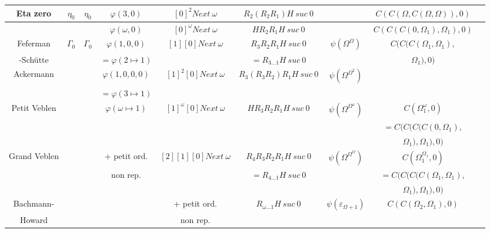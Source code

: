 \documentclass[12pt]{beamer}
\begin{document}
\begin{frame}
\begin{changemargin}{-0.9cm}{0cm}
\begin{tabular}{|c|c|c|c|c|c|c|c|c|}
Eta zero	& \(\eta_0\)		& \(\eta_0\)			& \(\varphi(3,0)\)		& \([0]^2 Next\ \omega\) 	& \(R_2 (R_2 R_1) H\ suc\ 0\)&					& \(C(C(\Omega,C(\Omega,\Omega)),0)\) \\ \hline
		&			&			& \(\varphi(\omega,0)\)		& \([0]^\omega Next\ \omega\) & \(H R_2 R_1 H\ suc\ 0\)&					& \(C(C(C(0,\Omega_1),\Omega_1),0)\) \\ \hline
Feferman	& \(\Gamma_0\)		
								& \(\Gamma_0\)			& \(\varphi(1,0,0)\)		& \([1] [0] Next\ \omega\)	& \(R_3 R_2 R_1 H\ suc\ 0\) & \(\psi(\Omega^\Omega)\)		& \(C(C(C(\Omega_1,\Omega_1),\) \\ 
-Schütte	&			&				& \(=\varphi(2 \mapsto 1)\)	&				& \(= R_{3 \ldots 1} H\ suc\ 0\) & 					& \(\Omega_1),0)\)		\\ \hline
Ackermann	&			&				& \(\varphi(1,0,0,0)\)		& \([1]^2 [0] Next\ \omega\) & \(R_3 (R_3 R_2) R_1 H\ suc\ 0\) & \(\psi(\Omega^{\Omega^2})\)		&				\\ 
		&			&				& \(=\varphi(3 \mapsto 1)\)	&				&			&					&				\\ \hline
Petit Veblen	&			&				& \(\varphi(\omega \mapsto 1)\)	& \([1]^\omega [0] Next\ \omega\) & \(H R_3 R_2 R_1 H\ suc\ 0\) & \(\psi(\Omega^{\Omega^\omega})\)	& \(C(\Omega_1^\omega,0)\)	\\
		&			&				&				&				&			&					& \(=C(C(C(C(0,\Omega_1), \)	\\ 
		&			&				&				&				&			&					& \(\Omega_1),\Omega_1),0)\)	\\ \hline
Grand Veblen	&			&				& + petit ord.	 	 	& \([2] [1] [0] Next\ \omega\)	& \(R_4 R_3 R_2 R_1 H\ suc\ 0\) & \(\psi(\Omega^{\Omega^\Omega})\)	& \(C(\Omega_1^{\Omega_1},0)\)	\\
		&			&				& non rep.			&				& \(= R_{4 \ldots 1} H\ suc\ 0\) &					& \(=C(C(C(C(\Omega_1,\Omega_1),\) \\ 
		&			&				&				&				&			&					& \( \Omega_1),\Omega_1),0) \)	\\ \hline
Bachmann-	&			&				&				& + petit ord.			& \(R_{\omega \ldots 1} H\ suc\ 0\) & \(\psi(\varepsilon_{\Omega+1})\)	& \(C(C(\Omega_2,\Omega_1),0)\)	\\
Howard		&			&				&				& non rep.			&			&					&				\\ \hline
  
\end{tabular}

\end{changemargin}

\end{frame}
\end{document}

